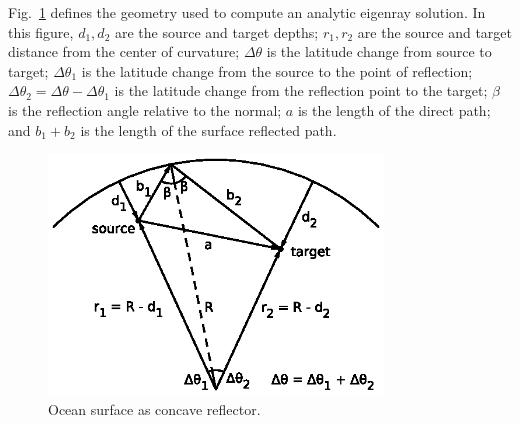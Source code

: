 \documentclass{ws-jca}
\begin{document}
Fig.~\ref{fig:eigenray_lloyds} defines the geometry used to compute an
analytic eigenray solution.  In this figure,
\( d_1, d_2 \) are the source and target depths; 
\( r_1, r_2 \) are the source and target distance from the center of curvature; 
\( \Delta \theta \) is the latitude change from source to target;
\( \Delta \theta_1 \) is the latitude change from the source to the point of reflection;
\( \Delta \theta_2 = \Delta \theta - \Delta \theta_1 \) is the latitude change from the reflection point to the target;
\( \beta \) is the reflection angle relative to the normal;
$a$ is the length of the direct path; and
\( b_1 + b_2 \) is the length of the surface reflected path.
\begin{figure}[th]
	\centerline{\includegraphics[width=3.5in]{EigenrayLloyds.eps}} 
	\vspace*{8pt}
	\caption{Ocean surface as concave reflector.
	\label{fig:eigenray_lloyds}}
\end{figure}
\end{document}
